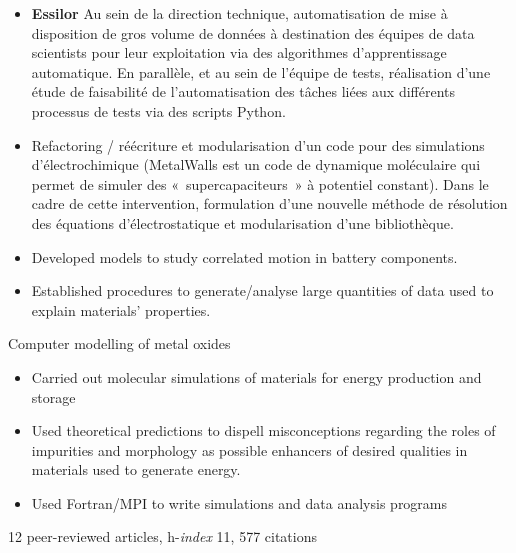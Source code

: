 \documentclass[10pt,a4paper,ragged2e,academicons]{altacv}
\begin{document}
\divider

\begin{itemize}
\item \textbf{Essilor} Au sein de la direction technique, automatisation de mise à disposition de gros volume de
données à destination des équipes de data scientists pour leur exploitation via des
algorithmes d’apprentissage automatique.
En parallèle, et au sein de l’équipe de tests, réalisation d’une étude de faisabilité de
l’automatisation des tâches liées aux différents processus de tests via des scripts Python. 
\end{itemize}

\divider

\begin{itemize}
\item Refactoring / réécriture et modularisation d’un code pour des simulations
d’électrochimique (MetalWalls est un code de dynamique moléculaire qui permet de
simuler des « supercapaciteurs » à potentiel constant).
Dans le cadre de cette intervention, formulation d’une nouvelle méthode de résolution
des équations d’électrostatique et modularisation d'une bibliothèque. 
\end{itemize}

\clearpage
{}

\begin{itemize}
\item Developed models to study correlated motion in
battery components.
\item Established procedures to generate/analyse large
quantities of data used to explain materials'
properties. 
\end{itemize}

\divider

Computer modelling of metal oxides
\smallskip
\begin{itemize}
\item Carried out molecular simulations of materials for energy production and storage
\item Used theoretical predictions to dispell
misconceptions regarding the roles of impurities
and morphology as possible enhancers of
desired qualities in materials used to generate
energy.
\item Used Fortran/MPI to write simulations and data analysis programs
\end{itemize}
{\small 12 peer-reviewed articles, h-\textit{index} 11, 577 citations}

\end{document}
